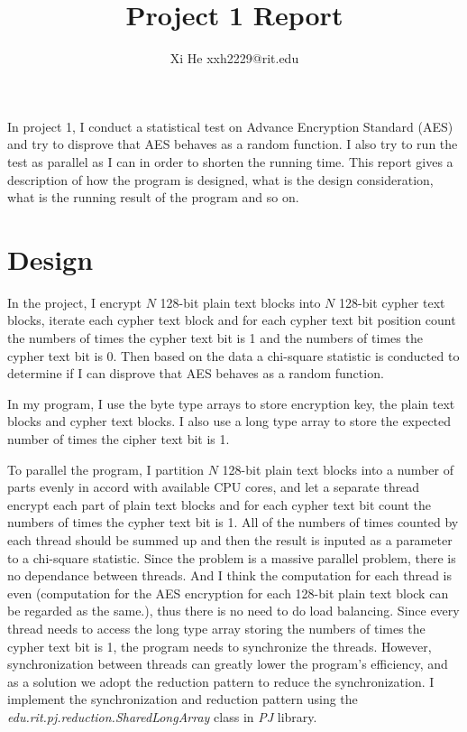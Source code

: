 \documentclass[12pt]{article}
\begin{document}
\title{Project 1 Report}
\author{Xi He xxh2229@rit.edu}

\maketitle


In project 1, I conduct a statistical test on Advance Encryption Standard (AES) and try to disprove that AES behaves as a random function.  I also try to run the test as parallel as I can in order to shorten the running time. This report gives a description of how the program is designed, what is the design consideration, what is the running result of the program and so on.  
\section{Design}
In the project, I encrypt $N$ 128-bit plain text blocks into $N$ 128-bit cypher text blocks, iterate each cypher text block and for each cypher text bit position count the numbers of times the cypher text bit is 1 and the numbers of times the cypher text bit is 0. Then based on the data a chi-square statistic is conducted to determine if I can disprove that AES behaves as a random function. 

In my program, I use the byte type arrays to store encryption key, the plain text blocks and cypher text blocks. I also use a long type array to store the expected number of times the cipher text bit is 1.   

To parallel the program, I partition $N$ 128-bit plain text blocks into a number of parts evenly in accord with available CPU cores, and let a separate thread encrypt each part of plain text blocks and for each cypher text bit count the numbers of times the cypher text bit is 1. All of the numbers of times counted by each thread should be summed up and then the result is inputed as a parameter to a chi-square statistic. Since the problem is a massive parallel problem, there is no dependance between threads. And I think the computation for each thread is even (computation for the AES encryption for each 128-bit plain text block can be regarded as the same.), thus there is no need to do load balancing. Since every thread needs to access the long type array storing the numbers of times the cypher text bit is 1, the program needs to synchronize the threads. However, synchronization between threads can greatly lower the program's efficiency,  and as a solution we adopt the reduction pattern to reduce the synchronization. I implement the synchronization and reduction pattern using the {\em edu.rit.pj.reduction.SharedLongArray} class in {\em PJ} library. 
\end{document}
